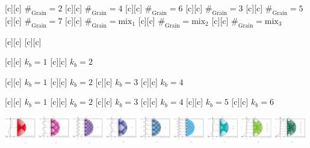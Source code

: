 [c][c] {\footnotesize $\#_{\text{Grain}}=2$}
[c][c] {\footnotesize $\#_{\text{Grain}}=4$}
[c][c] {\footnotesize $\#_{\text{Grain}}=6$}
[c][c] {\footnotesize $\#_{\text{Grain}}=3$}
[c][c] {\footnotesize $\#_{\text{Grain}}=5$}
[c][c] {\footnotesize $\#_{\text{Grain}}=7$}
[c][c] {\footnotesize $\#_{\text{Grain}}=\text{mix}_1$}
[c][c] {\footnotesize $\#_{\text{Grain}}=\text{mix}_2$}
[c][c] {\footnotesize $\#_{\text{Grain}}=\text{mix}_3$}

[c][c]   {}
[c][c]   {}

[c][c] {\tiny $k_{b} = 1$}
[c][c] {\tiny $k_{b} = 2$}

[c][c] {\tiny $k_{b} = 1$}
[c][c] {\tiny $k_{b} = 2$}
[c][c] {\tiny $k_{b} = 3$}
[c][c] {\tiny $k_{b} = 4$}

[c][c] {\tiny $k_{b} = 1$}
[c][c] {\tiny $k_{b} = 2$}
[c][c] {\tiny $k_{b} = 3$}
[c][c] {\tiny $k_{b} = 4$}
[c][c] {\tiny $k_{b} = 5$}
[c][c] {\tiny $k_{b} = 6$}

\includegraphics[width=0.99\textwidth]{characsin_rotate_semicircle_135246mix_horizontal.eps}